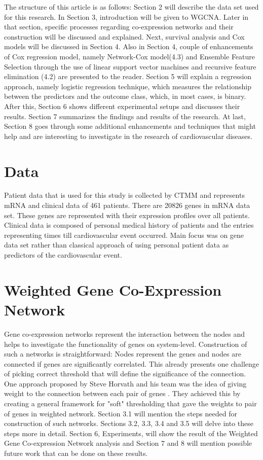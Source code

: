 \documentclass{ba-kecs}
\numberwithin{figure}{section}
\numberwithin{equation}{section}
\begin{document}
The structure of this article is as follows: Section 2 will describe the data set used for this research. In Section 3, introduction will be given to WGCNA. Later in that section, specific processes regarding co-expression networks and their construction will be discussed and explained. Next, survival analysis and Cox models will be discussed in Section 4. Also in Section 4, couple of enhancements of Cox regression model, namely Network-Cox model(4.3) and Ensemble Feature Selection through the use of linear support vector machines and recursive feature elimination (4.2) are presented to the reader. Section 5 will explain a regression approach, namely logistic regression technique, which measures the relationship between the predictors and the outcome class, which, in most cases, is binary.  After this, Section 6 shows different experimental setups and discusses their results. Section 7 summarizes the findings and results of the research. At last, Section 8 goes through some additional enhancements and techniques that might help and are interesting to investigate in the research of cardiovascular diseases.

\section{Data}
Patient data that is used for this study is collected by CTMM and represents mRNA and clinical data of 461 patients. There are 20826 genes in mRNA data set. These genes are represented with their expression profiles over all patients. Clinical data is composed of personal medical history of patients and the entries representing times till cardiovascular event occurred. Main focus was on gene data set rather than classical approach of using personal patient data as predictors of the cardiovascular event.

\section{Weighted Gene Co-Expression Network}
Gene co-expression networks represent the interaction between the nodes and helps to investigate the functionality of genes on system-level. Construction of such a networks is straightforward: Nodes represent the genes and nodes are connected if genes are significantly correlated. This already presents one challenge of picking correct threshold that will define the significance of the connection. One approach proposed by Steve Horvath and his team was the idea of giving weight to the connection between each pair of genes \cite{wgcna,wgcna3}. They achieved this by creating a general framework for "soft" thresholding that gave the weights to pair of genes in weighted network. Section 3.1 will mention the steps needed for construction of such networks. Sections 3.2, 3.3, 3.4 and 3.5 will delve into these steps more in detail. Section 6, Experiments, will show the result of the Weighted Gene Co-expression Network analysis and Section 7 and 8 will mention possible future work that can be done on these results.
\end{document}
